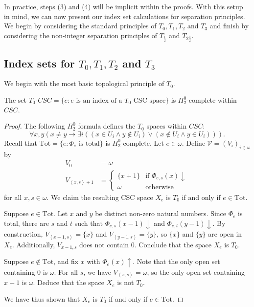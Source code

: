 \documentclass[11pt]{amsart}
\theoremstyle{remark}
\begin{document}
In practice, steps (3) and (4) will be implicit within the proofs.
With this setup in mind, we can now present our index set calculations for separation principles.
We begin by considering the standard principles of $T_0,T_1,T_2$ and $T_3$ and finish by considering the non-integer separation principles of $T_{\frac 12}$ and $T_{2 \frac12}$.

\subsection{Index sets for $T_0,T_1,T_2$ and $T_3$}
We begin with the most basic topological principle of $T_0.$

\begin{theorem}
    The set $T_0$-$CSC = \{e : \text{$e$ is an index of a $T_0$ CSC space}\}$ is $\Pi^0_2$-complete within $CSC$.
\end{theorem}
\begin{proof}
    The following $\Pi^0_2$ formula defines the $T_0$ spaces within $CSC$:
    \begin{equation*}
        \forall x, y (x \neq y \rightarrow \exists i ((x \in U_i \land y \notin U_i) \lor (x \notin U_i \land y \in U_i))).
    \end{equation*}
    Recall that $\mathrm{Tot} = \{e : \text{$\Phi_e$ is total}\}$ is $\Pi^0_2$-complete. Let $e \in \omega$. Define $\mathcal{V} = (V_i)_{i \in \omega}$ by
    \begin{align*}
        V_0 &= \omega\\
        V_{\left\langle x, s\right\rangle + 1} &= \begin{cases}
            \{x + 1\} & \text{if $\Phi_{e, s}(x) \downarrow$}\\
            \omega & \text{otherwise}
        \end{cases}
    \end{align*}
    for all $x, s \in \omega$. We claim the resulting CSC space $X_e$ is $T_0$ if and only if $e \in \mathrm{Tot}$.

    Suppose $e \in \mathrm{Tot}$. Let $x$ and $y$ be distinct non-zero natural numbers. Since $\Phi_e$ is total, there are $s$ and $t$ such that $\Phi_{e, s}(x-1) \downarrow$ and $\Phi_{e, t}(y-1) \downarrow$. By construction, $V_{\left\langle x-1, s \right\rangle} = \{x\}$ and $V_{\left\langle y-1, s \right\rangle} = \{y\}$, so $\{x\}$ and $\{y\}$ are open in $X_e$. Additionally, $V_{x-1, s}$ does not contain $0$. Conclude that the space $X_e$ is $T_0$.

    Suppose $e \notin \mathrm{Tot}$, and fix $x$ with $\Phi_e(x) \uparrow$. Note that the only open set containing $0$ is $\omega$. For all $s$, we have $V_{\left\langle x,s\right\rangle} = \omega$, so the only open set containing $x + 1$ is $\omega$. Deduce that the space $X_e$ is not $T_0$.

    We have thus shown that $X_e$ is $T_0$ if and only if $e \in \mathrm{Tot}$.
\end{proof}
\end{document}
